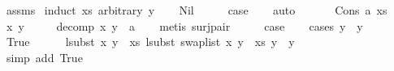 \begin{isabellebody}
%
\isadelimproof
%
\endisadelimproof
%
\isatagproof
{}\isamarkupfalse%
\ assms\isanewline
{}\isamarkupfalse%
\ {\isacharparenleft}{\kern0pt}induct\ xs\ arbitrary{\isacharcolon}{\kern0pt}\ y{\isacharparenright}{\kern0pt}\isanewline
\ \ \isamarkupfalse%
\ Nil\isanewline
\ \ \isamarkupfalse%
\ \isamarkupfalse%
\ {\isacharquery}{\kern0pt}case\isanewline
\ \ \isamarkupfalse%
\ auto\isanewline
\ \ \isamarkupfalse%
\isanewline
{}\isamarkupfalse%
\isanewline
\ \ \isamarkupfalse%
\ {\isacharparenleft}{\kern0pt}Cons\ a\ xs{\isacharparenright}{\kern0pt}\isanewline
\ \ \isamarkupfalse%
\ x\ y{\isacharprime}{\kern0pt}\ \isanewline
\ \ \ \ decomp{\isacharcolon}{\kern0pt}\ {\isachardoublequoteopen}{\isacharparenleft}{\kern0pt}x{\isacharcomma}{\kern0pt}\ y{\isacharprime}{\kern0pt}{\isacharparenright}{\kern0pt}\ {\isacharequal}{\kern0pt}\ a{\isachardoublequoteclose}\isanewline
\ \ \isamarkupfalse%
\ {\isacharparenleft}{\kern0pt}metis\ surj{\isacharunderscore}{\kern0pt}pair{\isacharparenright}{\kern0pt}\isanewline
\isanewline
\ \ \isamarkupfalse%
\ \isamarkupfalse%
\ {\isacharquery}{\kern0pt}case\isanewline
\ \ \isamarkupfalse%
\ {\isacharparenleft}{\kern0pt}cases\ {\isachardoublequoteopen}y\ {\isacharequal}{\kern0pt}\ y{\isacharprime}{\kern0pt}{\isachardoublequoteclose}{\isacharparenright}{\kern0pt}\isanewline
\ \ \ \ \isamarkupfalse%
\ True\isanewline
\ \ \ \ \isamarkupfalse%
\ {\isachardoublequoteopen}lsubst\ {\isacharparenleft}{\kern0pt}{\isacharparenleft}{\kern0pt}x{\isacharcomma}{\kern0pt}\ y{\isacharprime}{\kern0pt}{\isacharparenright}{\kern0pt}\ {\isacharhash}{\kern0pt}\ xs{\isacharparenright}{\kern0pt}\ {\isacharparenleft}{\kern0pt}lsubst\ {\isacharparenleft}{\kern0pt}swap{\isacharunderscore}{\kern0pt}list\ {\isacharparenleft}{\kern0pt}{\isacharparenleft}{\kern0pt}x{\isacharcomma}{\kern0pt}\ y{\isacharprime}{\kern0pt}{\isacharparenright}{\kern0pt}\ {\isacharhash}{\kern0pt}\ xs{\isacharparenright}{\kern0pt}{\isacharparenright}{\kern0pt}\ y{\isacharparenright}{\kern0pt}\ {\isacharequal}{\kern0pt}\ y{\isachardoublequoteclose}\isanewline
\ \ \ \ \ \ \isamarkupfalse%
\ {\isacharparenleft}{\kern0pt}simp\ add{\isacharcolon}{\kern0pt}\ True{\isacharparenright}{\kern0pt}\isanewline
\ \ \ \ \isamarkupfalse%

\end{isabellebody}
